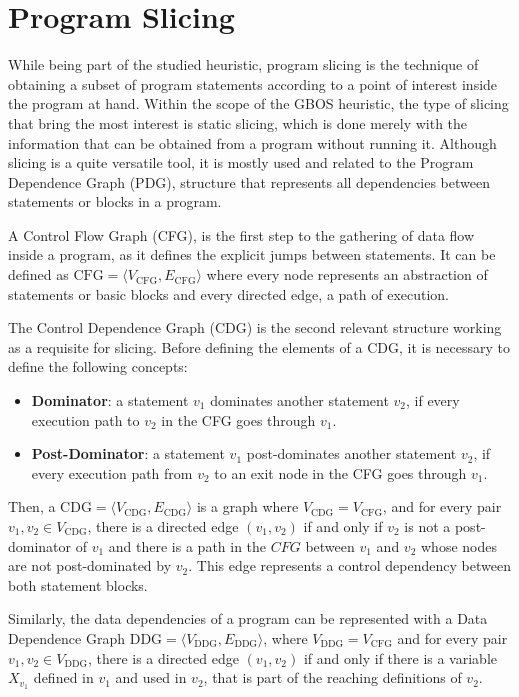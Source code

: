 \documentclass[%
  chapterprefix=false,%
  open=right,%
  twoside=true,%
  paper=a4,%
  logofile={Figures/logo.png},%
  thesistype=master,%
  UKenglish,%
]{se2thesis}
\begin{document}
\section{Program Slicing}\label{sec:slicing}

While being part of the studied heuristic, program slicing is the technique of obtaining a subset of program statements according to a point of interest inside the program at hand.
Within the scope of the GBOS heuristic, the type of slicing that bring the most interest is static slicing, which is done merely with the information that can be obtained from a program without running it.
Although slicing is a quite versatile tool, it is mostly used and related to the Program Dependence Graph (PDG), structure that represents all dependencies between statements or blocks in a program.

A Control Flow Graph (CFG), is the first step to the gathering of data flow inside a program, as it defines the explicit jumps between statements.
It can be defined as \(\text{CFG} = \langle V_{\text{CFG}}, E_{\text{CFG}} \rangle\) where every node represents an abstraction of statements or basic blocks and every directed edge, a path of execution.

The Control Dependence Graph (CDG) is the second relevant structure working as a requisite for slicing.
Before defining the elements of a CDG, it is necessary to define the following concepts:
\begin{itemize}
  \item \textbf{Dominator}: a statement \(v_1\) dominates another statement \(v_2\), if every execution path to \(v_2\) in the CFG goes through \(v_1\).
  \item \textbf{Post-Dominator}: a statement \(v_1\) post-dominates another statement \(v_2\), if every execution path from \(v_2\) to an exit node in the CFG goes through \(v_1\).
\end{itemize}
Then, a \(\text{CDG} = \langle V_{\text{CDG}}, E_{\text{CDG}} \rangle\) is a graph where \(V_{\text{CDG}} = V_{\text{CFG}}\), and for every pair \(v_1, v_2 \in V_{\text{CDG}}\), there is a directed edge \((v_1, v_2)\) if and only if \(v_2\) is not a post-dominator of \(v_1\) and there is a path in the \(CFG\) between \(v_1\) and \(v_2\) whose nodes are not post-dominated by \(v_2\).
This edge represents a control dependency between both statement blocks.

Similarly, the data dependencies of a program can be represented with a Data Dependence Graph \(\text{DDG} = \langle V_{\text{DDG}}, E_{\text{DDG}} \rangle\), where \(V_{\text{DDG}} = V_{\text{CFG}}\) and for every pair \(v_1, v_2 \in V_{\text{DDG}}\), there is a directed edge \((v_1, v_2)\) if and only if there is a variable \(X_{v_1}\) defined in \(v_1\) and used in \(v_2\), that is part of the reaching definitions of \(v_2\).
\end{document}
